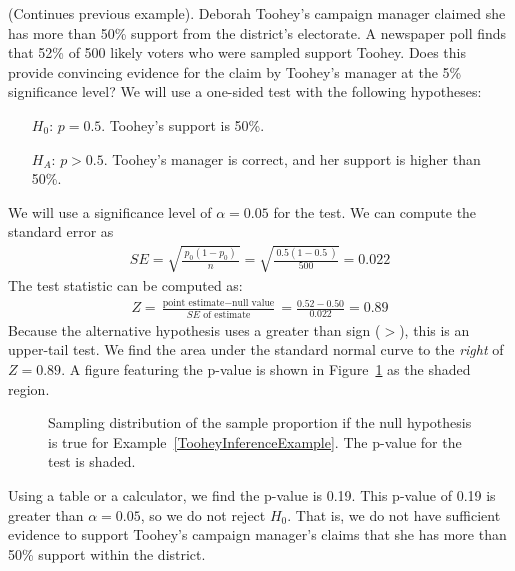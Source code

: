 \begin{examplewrap}
\begin{nexample}{(Continues previous example). Deborah Toohey's campaign manager claimed she has more than 50\% support from the district's electorate. A newspaper poll finds that 52\% of 500 likely voters who were sampled support Toohey. Does this provide convincing evidence for the claim by Toohey's manager at the 5\% significance level?}\label{TooheyInferenceExample}
We will use a one-sided test with the following hypotheses:
\begin{itemize}
\item[$H_0$:] $p = 0.5$. Toohey's support is 50\%.
\item[$H_A$:] $p > 0.5$. Toohey's manager is correct, and her support is higher than 50\%.
\end{itemize}
We will use a significance level of $\alpha = 0.05$ for the test. We can compute the standard error as
\begin{align*}
SE = \sqrt{\frac{\ p_0 (1 - p_0)\ }{n}} = \sqrt{\frac{\ 0.5 (1 - 0.5\ )}{500}} = 0.022
\end{align*}
The test statistic can be computed as:
\begin{align*}
Z =  \frac{\text{point estimate} - \text{null value}}{SE \text{ of estimate}} = \frac{0.52 - 0.50}{0.022} = 0.89
\end{align*}
Because the alternative hypothesis uses a greater than sign ($>$), this is an upper-tail test.  We find the area under the standard normal curve to the \emph{right} of $Z=0.89$.  A figure featuring the p-value is shown in Figure~\ref{pValueForCampaignManagerClaimOfMoreThan50PercentSupport} as the shaded region. 
\end{nexample}
\end{examplewrap}


\begin{figure}[h]
\centering
{}
\caption{Sampling distribution of the sample proportion if the null hypothesis is true for Example~\ref{TooheyInferenceExample}. The p-value for the test is shaded.}
\label{pValueForCampaignManagerClaimOfMoreThan50PercentSupport}
\end{figure}
Using a table or a calculator, we find the p-value is 0.19.  This p-value of 0.19 is greater than $\alpha = 0.05$, so we do not reject $H_0$. That is, we do not have sufficient  evidence to support Toohey's campaign manager's claims that she has more than 50\% support within the district.



